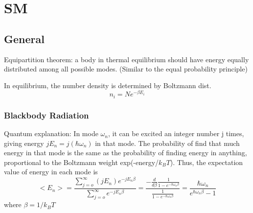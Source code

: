 \chapter{SM}
\section{General}
Equipartition theorem: a body in thermal equilibrium should have energy 
equally distributed among all possible modes. (Similar to the equal 
probability principle)

In equilibrium, the number density is determined by Boltzmann dist.
\begin{equation}
    \label{Boltzmann distribution}
    n_i = Ne^{-\beta E_i}
\end{equation}
\subsection{Blackbody Radiation}
Quantum explanation: In mode $\omega_n$, it can be excited an integer 
number j times, giving energy $jE_n = j(\hbar\omega_n)$ in that mode.
The probability of find that much energy in that mode is the same 
as the probability of finding energy in anything, proportional to 
the Boltzmann weight exp(-energy/$k_BT$). Thus, the expectation value of
energy in each mode is
\begin{equation}
    <E_n> = \frac{\sum_{j=o}^\infty(jE_n)e^{-jE_n\beta}}{\sum_{j=o}^\infty e^{-jE_n\beta}} = \frac{-\frac{d}{d\beta}\frac{1}{1-e^{-\hbar\omega_n\beta}}}{\frac{1}{1-e^{-\hbar\omega_n\beta}}} = \frac{\hbar\omega_n}{e^{\hbar\omega_n\beta}-1}
\end{equation}
where $\beta=1/k_BT$
